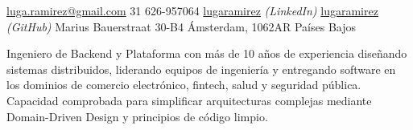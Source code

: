 \documentclass[10pt,a4paper]{article} %
\begin{document}


\noindent\href{mailto:luga.ramirez@gmail.com}{luga.ramirez@gmail.com}
\ifdefined\nophone\else\bull \textsmaller{+}31 626-957064\fi
\bull \href{https://www.linkedin.com/in/lugaramirez/}{lugaramirez} \textit{(LinkedIn)}
\bull \href{https://github.com/lugaramirez}{lugaramirez} \textit{(GitHub)}
\bull Marius Bauerstraat 30-B4
\bull Ámsterdam, 1062AR
\bull Países Bajos %

\spacedhrule{0.9em}{-0.4em} %



Ingeniero de Backend y Plataforma con más de 10 años de experiencia diseñando sistemas distribuidos, liderando equipos de ingeniería y entregando software en los dominios de comercio electrónico, fintech, salud y seguridad pública. Capacidad comprobada para simplificar arquitecturas complejas mediante Domain-Driven Design y principios de código limpio.

\spacedhrule{-1em}{-0.4em} %


\end{document}
